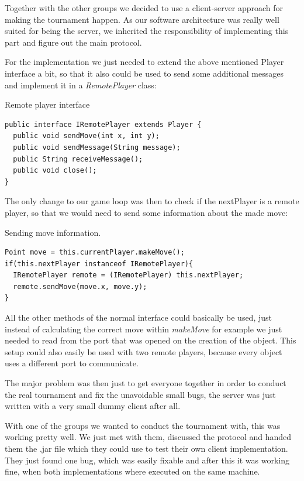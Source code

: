 \documentclass{scrartcl}
\begin{document}
Together with the other groups we decided to use a client-server approach for making the tournament happen. As our software architecture was really well suited for being the server, we inherited the responsibility of implementing this part and figure out the main protocol.

For the implementation we just needed to extend the above mentioned Player interface a bit, so that it also could be used to send some additional messages and implement it in a \textit{RemotePlayer} class: 

\begin{listing}[H]
\caption{Remote player interface}
\begin{verbatim}
public interface IRemotePlayer extends Player {
  public void sendMove(int x, int y);
  public void sendMessage(String message);
  public String receiveMessage();
  public void close();
}
\end{verbatim}
\end{listing}

The only change to our game loop was then to check if the nextPlayer is a remote player, so that we would need to send some information about the made move:

\begin{listing}[H]
\caption{Sending move information.}
\begin{verbatim}
Point move = this.currentPlayer.makeMove();
if(this.nextPlayer instanceof IRemotePlayer){
  IRemotePlayer remote = (IRemotePlayer) this.nextPlayer;
  remote.sendMove(move.x, move.y);
}
\end{verbatim}
\end{listing}

All the other methods of the normal interface could basically be used, just instead of calculating the correct move within \textit{makeMove} for example we just needed to read from the port that was opened on the creation of the object. This setup could also easily be used with two remote players, because every object uses a different port to communicate.

The major problem was then just to get everyone together in order to conduct the real tournament and fix the unavoidable small bugs, the server was just written with a very small dummy client after all.

With one of the groups we wanted to conduct the tournament with, this was working pretty well. We just met with them, discussed the protocol and handed them the .jar file which they could use to test their own client implementation. They just found one bug, which was easily fixable and after this it was working fine, when both implementations where executed on the same machine. 
\end{document}
